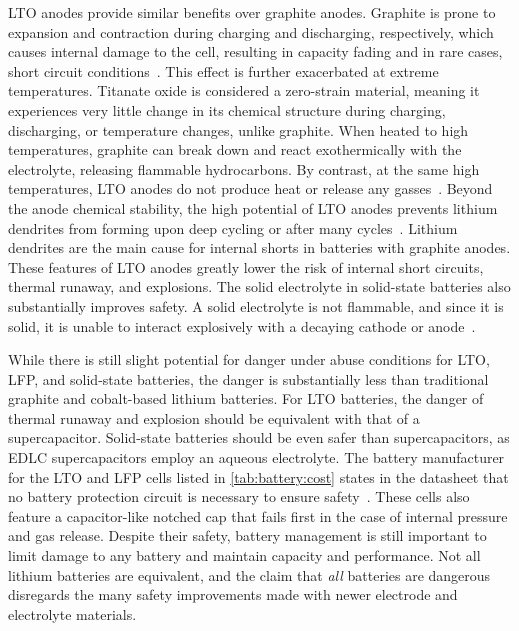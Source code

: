 LTO anodes provide similar benefits over graphite anodes. Graphite is prone to expansion and contraction during charging and discharging, respectively, which causes internal damage to the cell, resulting in capacity fading and in rare cases, short circuit conditions~\cite{sandhya2014lithium}. This effect is further exacerbated at extreme temperatures. 
Titanate oxide is considered a zero-strain material, meaning it experiences very little change in its chemical structure during charging, discharging, or temperature changes, unlike graphite. When heated to high temperatures, graphite can break down and react exothermically with the electrolyte, releasing flammable hydrocarbons. By contrast, at the same high temperatures, LTO anodes do not produce heat or release any gasses~\cite{belharouakElectrochemistry11}. Beyond the anode chemical stability, the high potential of LTO anodes prevents lithium dendrites from forming upon deep cycling or after many cycles~\cite{nitta2015li}. Lithium dendrites are the main cause for internal shorts in batteries with graphite anodes. These features of LTO anodes greatly lower the risk of internal short circuits, thermal runaway, and explosions.
The solid electrolyte in solid-state batteries also substantially improves safety. A solid electrolyte is not flammable, and since it is solid, it is unable to interact explosively with a decaying cathode or anode~\cite{kim2015review}.

While there is still slight potential for danger under abuse conditions for LTO, LFP, and solid-state batteries, the danger is substantially less than traditional graphite and cobalt-based lithium batteries. For LTO batteries, the danger of thermal runaway and explosion should be equivalent with that of a supercapacitor. Solid-state batteries should be even safer than supercapacitors, as EDLC supercapacitors employ an aqueous electrolyte.
The battery manufacturer for the LTO and LFP cells listed in \cref{tab:battery:cost} states in the datasheet that no battery protection circuit is necessary to ensure safety~\cite{LTODatasheet,LTODatasheet2}. 
These cells also feature a capacitor-like notched cap that fails first in the case of internal pressure and gas release.
Despite their safety, battery management is still important to limit damage to any battery and maintain capacity and performance. 
Not all lithium batteries are equivalent, and the claim that \textit{all} batteries are dangerous disregards the many safety improvements made with newer electrode and electrolyte materials.

